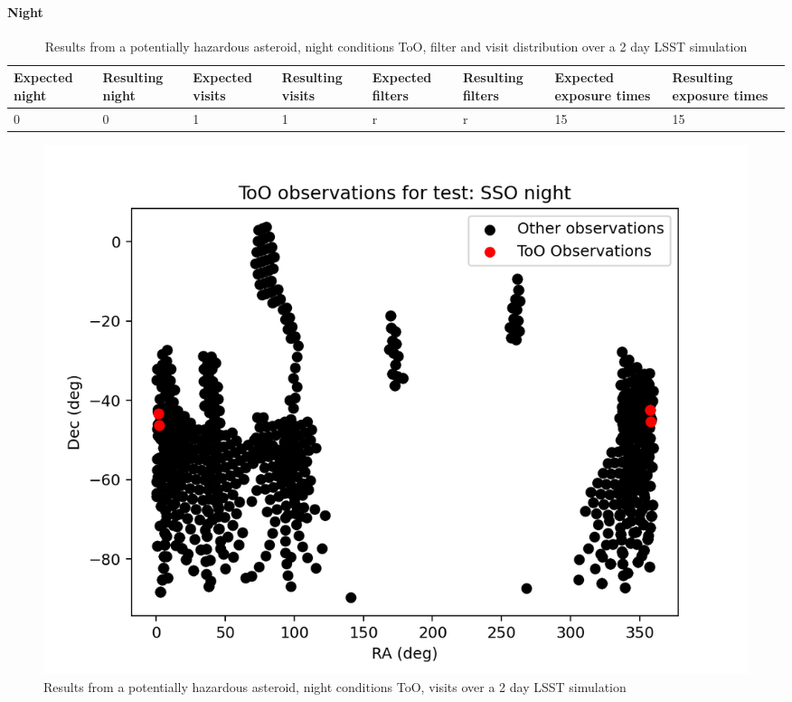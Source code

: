 \paragraph{Night}
\begin{table}[]
\centering
\begin{adjustbox}{max width=\textwidth}
\begin{tabular}{|l|l|l|l|l|l|l|l|}
\hline
Expected night & Resulting night & Expected visits & Resulting visits & Expected filters & Resulting filters & Expected exposure times & Resulting exposure times \\ \hline
0              & 0               & 1               & 1                & r                & r                 & 15                      & 15                       \\ \hline
\end{tabular}
\end{adjustbox}
\caption{Results from a potentially hazardous asteroid, night conditions ToO, filter and visit distribution over a 2 day LSST simulation}
\label{tab:PHANightResult}
\end{table}

\begin{figure}
    \centering
    \includegraphics[width=\linewidth]{figures/validationTests/SVRequired/PHANightPosition.png}
    \caption{Results from a potentially hazardous asteroid, night conditions ToO, visits over a 2 day LSST simulation}
    \label{fig:PHANightPositionResult}
\end{figure}


